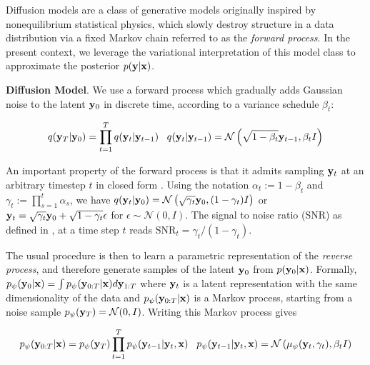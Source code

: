 \documentclass{article}
\begin{document}
Diffusion models \citep{SohlDickstein2015,Ho2020,Song2021} are a class of generative models originally inspired by nonequilibrium statistical physics, which slowly destroy structure in a data distribution via a fixed Markov chain referred to as the \emph{forward process}. In the present context, we leverage the variational interpretation of this model class \citep{Kingma2021,Kingma2023} to approximate the posterior $p(\bold{y}|\bold{x})$. 

\textbf{Diffusion Model}. We use a forward process which gradually adds Gaussian noise to the latent $\bold{y}_0$ in discrete time, according to a variance schedule $\beta_{t}$:

\begin{equation}
q(\bold{y}_{T}|\bold{y}_{0}) = \prod_{t=1}^{T}q(\bold{y}_{t}|\bold{y}_{t-1}) \;\;\; q(\bold{y}_{t}|\bold{y}_{t-1}) = \mathcal{N}\left(\sqrt{1-\beta_{t}}\bold{y}_{t-1},\beta_t I\right)
\end{equation}

An important property of the forward process is that it admits sampling $\bold{y}_t$ at an arbitrary timestep $t$ in closed form \citep{Ho2020}. Using the notation $\alpha_t := 1 - \beta_t$ and $\gamma_t := \prod_{s=1}^{t} \alpha_s$, we have $q(\bold{y}_t|\bold{y}_0) = \mathcal{N} \left(\sqrt{\gamma_{t}} \bold{y}_{0}, (1 - \gamma_t)I \right)$ or $\bold{y}_{t} = \sqrt{\gamma_{t}}\bold{y}_{0} + \sqrt{1-\gamma_{t}}\bold{\epsilon}$ for $\epsilon \sim \mathcal{N}(0,I)$. The signal to noise ratio (SNR) as defined in \citep{Kingma2023}, at a time step $t$ reads $\mathrm{SNR}_t = \gamma_{t}/(1-\gamma_{t})$.

The usual procedure is then to learn a parametric representation of the \emph{reverse process}, and therefore generate samples of the latent $\bold{y}_{0}$ from  $p(\bold{y}_{0}|\bold{x})$. Formally, $p_{\psi}(\bold{y}_{0}|\bold{x}) = \int p_{\psi}(\bold{y}_{0:T}|\bold{x})d\bold{y}_{1:T}$ where $\bold{y}_{t}$ is a latent representation with the same dimensionality of the data and $p_{\psi}(\bold{y}_{0:T}|\bold{x})$ is a Markov process, starting from a noise sample $p_{\psi}(\bold{y}_{T}) = \mathcal{N}(0,I)$. Writing this Markov process gives

\begin{equation}
p_{\psi}(\bold{y}_{0:T}|\bold{x}) = p_{\psi}(\bold{y}_{T})\prod_{t=1}^{T} p_{\psi}(\bold{y}_{t-1}|\bold{y}_{t},\bold{x}) \;\;\; p_{\psi}(\bold{y}_{t-1}|\bold{y}_{t},\bold{x}) = \mathcal{N}\left(\mu_{\psi}(\bold{y}_{t},\gamma_{t}),\beta_{t}I\right)
\end{equation}
\end{document}
